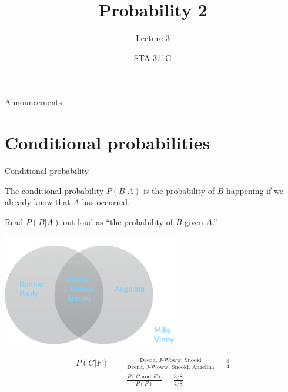 \documentclass{beamer}\usepackage[]{graphicx}\usepackage[]{color}
\title{Probability 2}
\subtitle{Lecture 3}
\author{STA 371G}
\begin{document}
  \frame{\maketitle}



  \begin{darkframes}
    \begin{frame}{Announcements}
    \end{frame}

    \section{Conditional probabilities}

    \begin{frame}{Conditional probability}
      \begin{definition}
        The \alert{conditional probability} $P(B|A)$ is the probability of $B$ happening if we already know that $A$ has occurred.
      \end{definition}

      Read $P(B|A)$ out loud as ``the probability of $B$ given $A$.''
    \end{frame}

    
    \begin{frame}
    \end{frame}


    \begin{frame}
      \begin{center}
        \includegraphics[width=3in]{venn}
      \end{center}
      
      \begin{align*}
        P(C|F) &= \frac{\text{Deena, J-Woww, Snooki}}{\text{Deena, J-Woww, Snooki, Angelina}} = \frac{3}{4} \\ 
               &= \frac{P(\text{$C$ and $F$})}{P(F)} = \frac{3/8}{4/8}
      \end{align*}
    \end{frame}



\end{darkframes}
\end{document}
